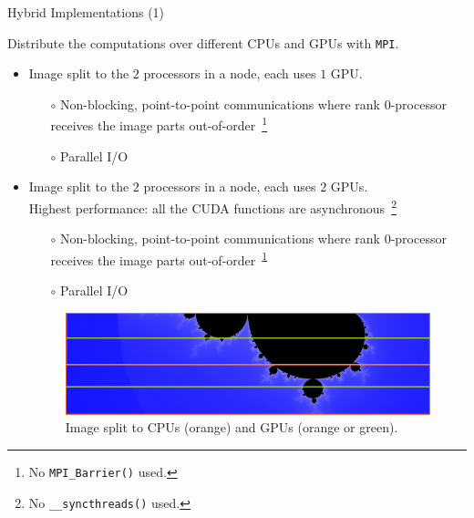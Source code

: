 \documentclass[10pt]{beamer}
\begin{document}
\begin{frame}{Hybrid Implementations (1)}
	
	Distribute the computations over different CPUs and GPUs with \texttt{MPI}.
	\begin{itemize}
		\item Image split to the $2$ processors in a node, each uses $1$ GPU.
		\begin{itemize}
			\item[$\circ$] Non-blocking, point-to-point communications where rank $0$-processor receives the image parts out-of-order~\footnote{No \texttt{MPI\_Barrier()} used.\label{no_barrier}}
			\item[$\circ$] Parallel I/O
		\end{itemize}	
		\item Image split to the $2$ processors in a node, each uses $2$ GPUs.\\
		Highest performance: all the CUDA functions are asynchronous~\footnote{No \texttt{\_\_syncthreads()} used.}
		\begin{itemize}
			\vspace{-0.5cm}
			\item[$\circ$] Non-blocking, point-to-point communications where rank $0$-processor receives the image parts out-of-order~\textsuperscript{\ref{no_barrier}}
			\item[$\circ$] Parallel I/O
		\end{itemize}
		\begin{figure}
			\centering
			\includegraphics[width=.7\linewidth]{hybrid-split.pdf}
			\vspace{-0.2cm}
			\caption{Image split to CPUs (orange) and GPUs (orange or green).}
			\label{fig:hybrid-split}
		\end{figure}
		
	\end{itemize}

\end{frame}
\end{document}
